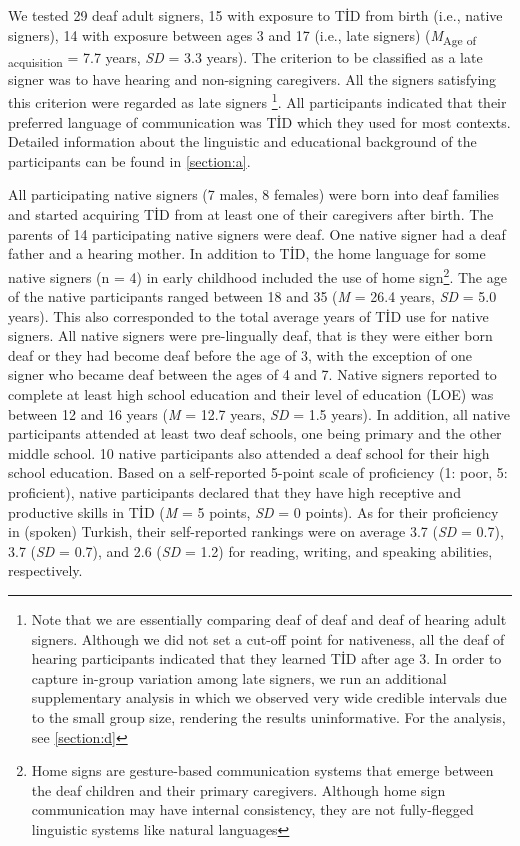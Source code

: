 \documentclass[]{elsarticle} %
\begin{document}
We tested 29 deaf adult signers, 15 with exposure to TİD from birth
(i.e., native signers), 14 with exposure between ages 3 and 17 (i.e.,
late signers) (\emph{M}\textsubscript{Age of acquisition} = 7.7 years,
\emph{SD} = 3.3 years). The criterion to be classified as a late signer
was to have hearing and non-signing caregivers. All the signers
satisfying this criterion were regarded as late signers
\footnote{Note that we are essentially comparing deaf of deaf and deaf of hearing adult signers. Although we did not set a cut-off point for nativeness, all the deaf of hearing participants indicated that they learned TİD after age 3. In order to capture in-group variation among late signers, we run an additional supplementary analysis in which we observed very wide credible intervals due to the small group size, rendering the results uninformative. For the analysis, see \ref{section:d}}.
All participants indicated that their preferred language of
communication was TİD which they used for most contexts. Detailed
information about the linguistic and educational background of the
participants can be found in \ref{section:a}.

All participating native signers (7 males, 8 females) were born into
deaf families and started acquiring TİD from at least one of their
caregivers after birth. The parents of 14 participating native signers
were deaf. One native signer had a deaf father and a hearing mother. In
addition to TİD, the home language for some native signers (n = 4) in
early childhood included the use of home
sign\footnote{Home signs are gesture-based communication systems that emerge between the deaf children and their primary caregivers. Although home sign communication may have internal consistency, they are not fully-flegged linguistic systems like natural languages}.
The age of the native participants ranged between 18 and 35 (\emph{M} =
26.4 years, \emph{SD} = 5.0 years). This also corresponded to the total
average years of TİD use for native signers. All native signers were
pre-lingually deaf, that is they were either born deaf or they had
become deaf before the age of 3, with the exception of one signer who
became deaf between the ages of 4 and 7. Native signers reported to
complete at least high school education and their level of education
(LOE) was between 12 and 16 years (\emph{M} = 12.7 years, \emph{SD} =
1.5 years). In addition, all native participants attended at least two
deaf schools, one being primary and the other middle school. 10 native
participants also attended a deaf school for their high school
education. Based on a self-reported 5-point scale of proficiency (1:
poor, 5: proficient), native participants declared that they have high
receptive and productive skills in TİD (\emph{M} = 5 points, \emph{SD} =
0 points). As for their proficiency in (spoken) Turkish, their
self-reported rankings were on average 3.7 (\emph{SD} = 0.7), 3.7
(\emph{SD} = 0.7), and 2.6 (\emph{SD} = 1.2) for reading, writing, and
speaking abilities, respectively.
\end{document}
